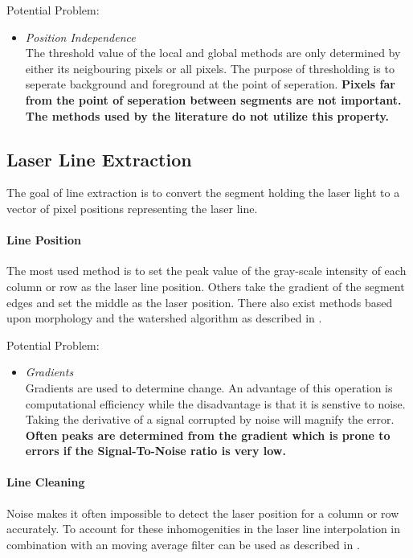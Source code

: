 \skippar
Potential Problem:
\begin{itemize}
\item \textit{Position Independence} \label{pblm: pos_ind} \\
The threshold value of the local and global methods are only determined by either its neigbouring pixels or all pixels. The purpose of thresholding is to seperate background and foreground at the point of seperation. \textbf{Pixels far from the point of seperation between segments are not important. The methods used by the literature do not utilize this property.}
\end{itemize}

\subsection*{Laser Line Extraction} \label{ssc: line extraction}
The goal of line extraction is to convert the segment holding the laser light to a vector of pixel positions representing the laser line. 

\paragraph{Line Position}
The most used method   \cite{nguyen2014laser} \cite{kim1995robust} \cite{li2010measurement} \cite{huang2012development} is to set the peak value of the gray-scale intensity of each column or row as the laser line position. Others \cite{davis2011vision} \cite{xu2004features} \cite{zhang2007vision} take the gradient of the segment edges and set the middle as the laser position. There also exist methods based upon morphology and the watershed algorithm as described in \cite{li2007recent}.

\skippar
Potential Problem:
\begin{itemize}
\item \textit{Gradients} \label{pblm: gradients} \\
Gradients are used to determine change. An advantage of this operation is computational efficiency while the disadvantage is that it is senstive to noise. Taking the derivative of a signal corrupted by noise will magnify the error. \textbf{Often peaks are determined from the gradient which is prone to errors if the Signal-To-Noise ratio is very low.}
\end{itemize}

\paragraph{Line Cleaning}
Noise makes it often impossible to detect the laser position for a column or row accurately. To account for these inhomogenities in the laser line interpolation in combination with an moving average filter can be used as described in \cite{wang2014weld}.

